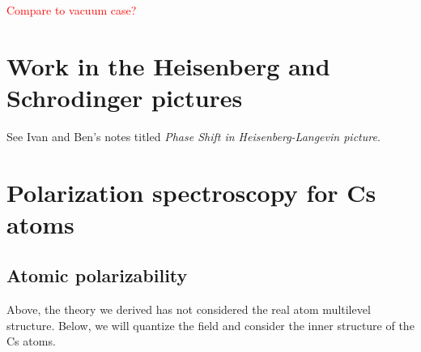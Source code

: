 \documentclass[]{report}
\begin{document}
\textcolor{red}{Compare to vacuum case?}


\section{Work in the Heisenberg and Schrodinger pictures}
See Ivan and Ben's notes titled \textit{Phase Shift in Heisenberg-Langevin picture}.

\section{Polarization spectroscopy for Cs atoms}
\subsection{Atomic polarizability}
Above, the theory we derived has not considered the real atom multilevel structure. Below, we will quantize the field and consider the inner structure of the Cs atoms.
\end{document}
